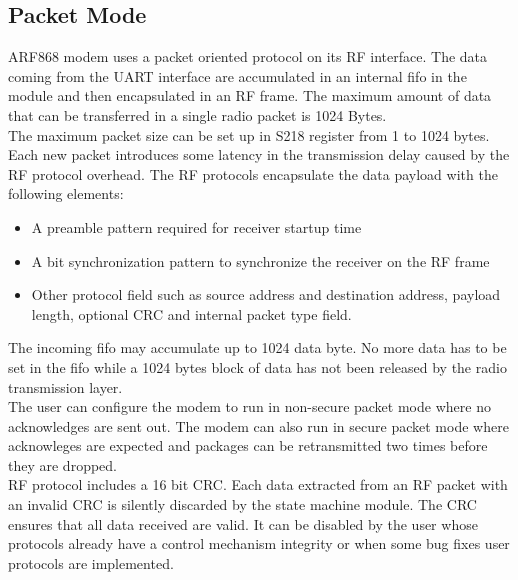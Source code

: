 \subsection{Packet Mode}
ARF868 modem uses a packet oriented protocol on its RF interface. The data coming from the UART interface are accumulated in an internal fifo in the module and then encapsulated in an RF frame. The maximum amount of data that can be transferred in a single radio packet is 1024 Bytes.\\
The maximum packet size can be set up in S218 register from 1 to 1024 bytes. Each new packet introduces some latency in the transmission delay caused by the RF protocol overhead. The RF protocols encapsulate the data payload with the following elements:
\begin{itemize}
    \item  A preamble pattern required for receiver startup time
    \item A bit synchronization pattern to synchronize the receiver on the RF frame
    \item Other protocol field such as source address and destination address, payload length, optional CRC and internal packet type field.
\end{itemize}
The incoming fifo may accumulate up to 1024 data byte. No more data has to be set in the fifo while a 1024 bytes block of data has not been released by the radio transmission layer.\\
The user can configure the modem to run in non-secure packet mode where no acknowledges are sent out. The modem can also run in secure packet mode where acknowleges are expected and packages can be retransmitted two times before they are dropped. \\
RF protocol includes a 16 bit CRC. Each data extracted from an RF packet with an invalid CRC is silently discarded by the state machine module. The CRC ensures that all data received are valid. It can be disabled by the user whose protocols already have a control mechanism integrity or when some bug fixes user protocols are implemented.
%